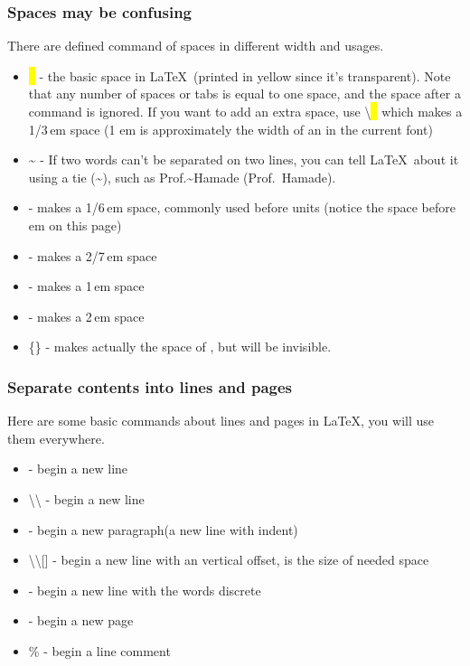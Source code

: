\begin{frame}
	\frametitle{Spaces may be confusing}
	There are defined command of spaces in different width and usages.
	\begin{itemize}
		\item \colorbox{yellow}{\ } - the basic space in \LaTeX\ (printed in yellow since it's transparent). Note that any number of spaces or tabs is equal to one space, and the space after a command is ignored. If you want to add an extra space, use \alert{\textbackslash}\colorbox{yellow}{\ } which makes a 1/3\,em space (1 em is approximately the width of an  in the current font)
		\item \~{} - If two words can't be separated on two lines, you can tell \LaTeX\ about it using a tie (\~{}), such as Prof.\~{}Hamade (Prof.~Hamade).
		\item  \samplecommand{,} - makes a 1/6\,em space, commonly used before units (notice the space before em on this page)
		\item  \samplecommand{;} - makes a 2/7\,em space
		\item  {} - makes a 1\,em space
		\item  {} - makes a 2\,em space
		\item  {}\{\} - makes actually the space of , but  will be invisible.
	\end{itemize}
\end{frame}

\begin{frame}
	\frametitle{Separate contents into lines and pages}
	Here are some basic commands about lines and pages in \LaTeX, you will use them everywhere.
	\begin{itemize}
		\item {} - begin a new line
		\item \alert{\textbackslash\textbackslash} - begin a new line
		\item {} - begin a new paragraph(a new line with indent)
		\item \alert{\textbackslash\textbackslash [}\alert{]} - begin a new line with an vertical offset,  is the size of needed space
		\item {} - begin a new line with the words discrete
		\item {} - begin a new page
		\item \alert{\%} - begin a line comment
	\end{itemize}
\end{frame}

